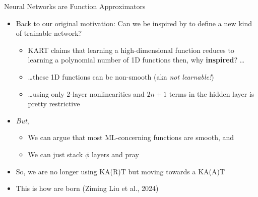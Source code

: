 
\begin{frame}{Neural Networks are Function Approximators}

\begin{itemize}
\item Back to our original motivation:
  Can we be inspired by  to define a new kind of trainable network?
    \begin{itemize}
        \item KART claims that learning a high-dimensional function reduces to learning a polynomial number of 1D functions then, why \textbf{inspired}? \dots
        \item \dots these 1D functions can be non-smooth (aka \textit{not learnable!})
        \item \dots using only 2-layer nonlinearities and $2n + 1$ terms in the hidden layer is pretty restrictive
    \end{itemize}
    \vspace{1em}
    \item \textit{But},
    \begin{itemize}
        \item We can argue that most ML-concerning functions are smooth, and
        \item We can just stack $\phi$ layers and pray
    \end{itemize}
    \vspace{1em}
    \item So, we are no longer using KA(R)T but moving towards a KA(A)T
    \vspace{1em}
    \item This is how  are born (Ziming Liu et al., 2024)
\end{itemize}

\end{frame}
